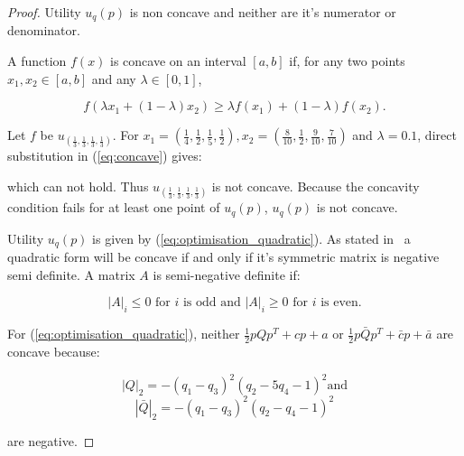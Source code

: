 \begin{proof} Utility \(u_q(p)\) is non concave and neither are it's numerator or
denominator.

A function \(f(x)\) is concave on an interval \([a, b]\) if, for any two
points \(x_1, x_2 \in [a, b]\) and any \(\lambda \in [0, 1]\), 

\begin{equation}\label{eq:concave}
f (\lambda x_1 + (1 - \lambda )x_2 ) \geq \lambda f (x_1 ) + (1 - \lambda )f (x_2 ).
\end{equation}

Let \(f\) be \(u_{(\frac{1}{3}, \frac{1}{3}, \frac{1}{3}, \frac{1}{3})}\).
For \(x_1 = (\frac{1}{4}, \frac{1}{2}, \frac{1}{5} , \frac{1}{2}),
x_2 = (\frac{8}{10}, \frac{1}{2}, \frac{9}{10} , \frac{7}{10})\) and
\(\lambda=0.1\), direct substitution in (\ref{eq:concave}) gives:


which can not hold. Thus \(u_{(\frac{1}{3}, \frac{1}{3}, \frac{1}{3}, \frac{1}{3})}\)
is not concave. Because the concavity condition fails for at least one point of
\(u_q(p)\), \(u_q(p)\) is not concave.

Utility \(u_q(p)\) is given by (\ref{eq:optimisation_quadratic}). As stated
in~\cite{Anton2014} a quadratic form will be concave if and only if it's
symmetric matrix is negative semi definite. A matrix \(A\) is semi-negative
definite if:

\begin{equation}\label{def:semi_negative}
|A|_i \leq 0 \text{ for } i \text{ is odd and } |A|_i \geq 0  \text{ for } i
\text{ is even.}
\end{equation}

For (\ref{eq:optimisation_quadratic}), neither \(\frac{1}{2}pQp^T + cp + a\)
or \(\frac{1}{2}p\bar{Q}p^T + \bar{c}p + \bar{a}\) are concave because:

\[|Q|_2 = - \left(q_{1} - q_{3}\right)^{2} \left(q_{2} - 5 q_{4} - 1\right)^{2} \text{and}\]
\[|\bar{Q}|_2 =- \left(q_{1} - q_{3}\right)^{2} \left(q_{2} - q_{4} - 1\right)^{2}\]

are negative.
\end{proof}